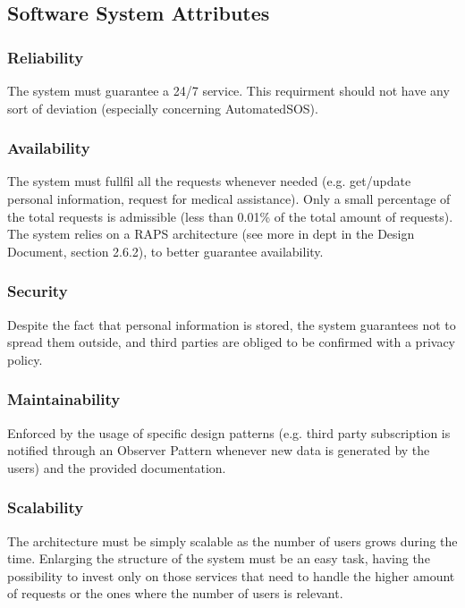 \documentclass[12pt,a4paper]{article}
\begin{document}

	\subsection{Software System Attributes}
		\subsubsection{Reliability}
		The system must guarantee a 24/7 service. This requirment should not have any sort of deviation (especially concerning AutomatedSOS).
		\subsubsection{Availability}
		The system must fullfil all the requests whenever needed (e.g. get/update personal information, request for medical assistance). Only a small percentage of the total requests is admissible (less than 0.01\% of the total amount of requests). The system relies on a RAPS architecture (see more in dept in the Design Document, section 2.6.2), to better guarantee availability.
		\subsubsection{Security}
		Despite the fact that personal information is stored, the system guarantees not to spread them outside, and third parties are obliged to be confirmed with a privacy policy.
		\subsubsection{Maintainability}
		Enforced by the usage of specific design patterns (e.g. third party subscription is notified through an Observer Pattern whenever new data is generated by the users) and the provided documentation.
		\subsubsection{Scalability}
		The architecture must be simply scalable as the number of users grows during the time.
		 Enlarging the structure of the system must be an easy task, having the possibility to invest only on those services that need to handle the higher amount of requests or the ones where the number of users is relevant.
\end{document}
